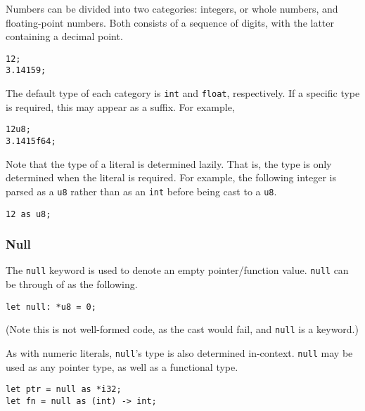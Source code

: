 Numbers can be divided into two categories: integers, or whole numbers, and floating-point numbers.
Both consists of a sequence of digits, with the latter containing a decimal point.

\begin{lstlisting}[language=CustomLang]
12;
3.14159;
\end{lstlisting}

The default type of each category is \texttt{int} and \texttt{float}, respectively.
If a specific type is required, this may appear as a suffix.
For example,

\begin{lstlisting}[language=CustomLang]
12u8;
3.1415f64;
\end{lstlisting}

Note that the type of a literal is determined lazily.
That is, the type is only determined when the literal is required.
For example, the following integer is parsed as a \texttt{u8} rather than as an \texttt{int} before being cast to a \texttt{u8}.

\begin{lstlisting}[language=CustomLang]
12 as u8;
\end{lstlisting}

\subsubsection{Null}

The \texttt{null} keyword is used to denote an empty pointer/function value.
\texttt{null} can be through of as the following.

\begin{lstlisting}[language=CustomLang]
let null: *u8 = 0;
\end{lstlisting}

(Note this is not well-formed code, as the cast would fail, and \texttt{null} is a keyword.)

As with numeric literals, \texttt{null}'s type is also determined in-context.
\texttt{null} may be used as any pointer type, as well as a functional type.

\begin{lstlisting}[language=CustomLang]
let ptr = null as *i32;
let fn = null as (int) -> int;
\end{lstlisting}
